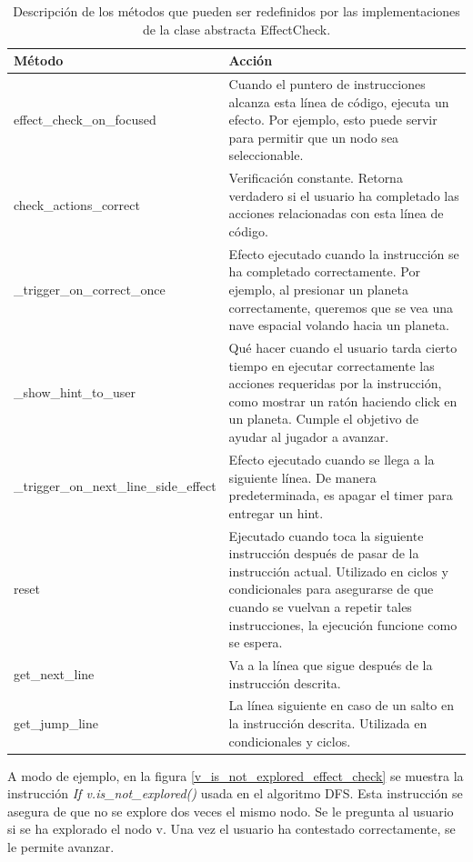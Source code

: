 \begin{table}[h]
    \centering
    \begin{tabular}{|l|p{}|}
        \hline
        \textbf{Método} & \textbf{Acción} \\
        \hline
        effect\_check\_on\_focused & Cuando el puntero de instrucciones alcanza esta línea de código, ejecuta un efecto. Por ejemplo, esto puede servir para permitir que un nodo sea seleccionable.\\
        \hline
        check\_actions\_correct & Verificación constante. Retorna verdadero si el usuario ha completado las acciones relacionadas con esta línea de código.  \\
        \hline
        \_trigger\_on\_correct\_once & Efecto ejecutado cuando la instrucción se ha completado correctamente. Por ejemplo, al presionar un planeta correctamente, queremos que se vea una nave espacial volando hacia un planeta. \\
        \hline
		\_show\_hint\_to\_user & Qué hacer cuando el usuario tarda cierto tiempo en ejecutar correctamente las acciones requeridas por la instrucción, como mostrar un ratón haciendo click en un planeta. Cumple el objetivo de ayudar al jugador a avanzar. \\
        \hline
        \_trigger\_on\_next\_line\_side\_effect & Efecto ejecutado cuando se llega a la siguiente línea. De manera predeterminada, es apagar el timer para entregar un hint.\\
        \hline
        reset & Ejecutado cuando toca la siguiente instrucción después de pasar de la instrucción actual. Utilizado en ciclos y condicionales para asegurarse de que cuando se vuelvan a repetir tales instrucciones, la ejecución funcione como se espera.  \\
        \hline
        get\_next\_line & Va a la línea que sigue después de la instrucción descrita. \\
        \hline
        get\_jump\_line & La línea siguiente en caso de un salto en la instrucción descrita. Utilizada en condicionales y ciclos. \\
        \hline
    \end{tabular}
    \caption{Descripción de los métodos que pueden ser redefinidos por las implementaciones de la clase abstracta EffectCheck.}
    \label{table_effect_check_methods}
\end{table}

\restoregeometry

A modo de ejemplo, en la figura \ref{v_is_not_explored_effect_check} se muestra la instrucción \emph{If v.is\_not\_explored()} usada en el algoritmo DFS. Esta instrucción se asegura de que no se explore dos veces el mismo nodo. Se le pregunta al usuario si se ha explorado el nodo v. Una vez el usuario ha contestado correctamente, se le permite avanzar.

